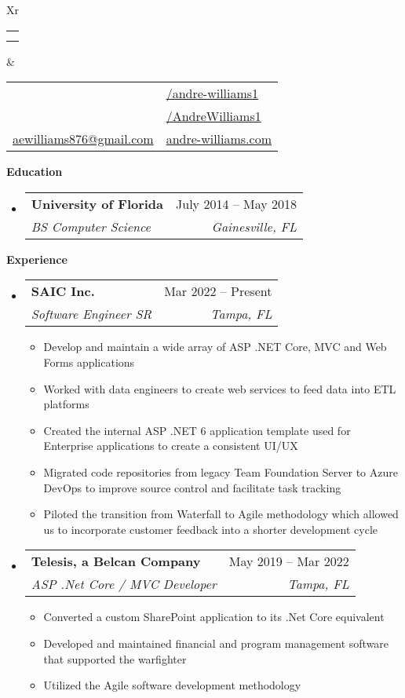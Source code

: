 \documentclass[letterpaper,12pt]{article}[leftmargin=*]
\makeatletter
\def \fullname {Andre Williams}
\def \subtitle {}
\def \linkedinicon {\faLinkedin}
\def \linkedinlink {https://linkedin.com/in/andre-williams1/}
\def \linkedintext {/andre-williams1}
\def \phoneicon {\faPhone}
\def \phonetext {(561) 452-1398}
\def \addressicon {\faMapMarker}
\def \addresstext {7104 S Mascotte St, 33616}
\def \emailicon {\faEnvelope}
\def \emaillink {mailto:aewilliams876@gmail.com}
\def \emailtext {aewilliams876@gmail.com}
\def \githubicon {\faGithub}
\def \githublink {https://github.com/andrewilliams1}
\def \githubtext {/AndreWilliams1}
\def \websiteicon {\faGlobe}
\def \websitelink {andre-williams.com}
\def \websitetext {andre-williams.com}
\def \headertype {\doublecol} %
\def \entryspacing {-0pt}
\def \linkedin {\linkedinicon \hspace{3pt}\href{\linkedinlink}{\linkedintext}}
\def \phone {\phoneicon \hspace{3pt}{ \phonetext}}
\def \address {\addressicon \hspace{3pt}{ \addresstext}}
\def \email {\emailicon \hspace{3pt}\href{\emaillink}{\emailtext}}
\def \github {\githubicon \hspace{3pt}\href{\githublink}{\githubtext}}
\def \website {\websiteicon \hspace{3pt}\href{\websitelink}{\websitetext}}
\renewcommand{\section}[2]{\vspace{5pt}
  \colorbox{secondary}{\color{white}\raggedbottom\normalsize\textbf{{#1}{\hspace{7pt}#2}}}
}
\newcommand{\resumeEntryStart}{\begin{itemize}[leftmargin=2.5mm]}
\newcommand{\resumeEntryEnd}{\end{itemize}\vspace{\entryspacing}}
\newcommand{\resumeItemListStart}{\begin{itemize}[leftmargin=4.5mm]}
\newcommand{\resumeItemListEnd}{\end{itemize}}
\newcommand{\resumeItem}[1]{
  \item\small{
    {#1 \vspace{-2pt}}
  }
}
\newcommand{\resumeEntryTSDL}[4]{
  \vspace{-1pt}\item[]
    \begin{tabularx}{0.97\textwidth}{X@{\hspace{60pt}}r}
      \textbf{\color{primary}#1} & {\firabook\color{accent}\small#2} \\
      \textit{\color{accent}\small#3} & \textit{\color{accent}\small#4} \\
    \end{tabularx}\vspace{-6pt}
}
\newcommand{\doublecol}[6]{
  \begin{tabularx}{\textwidth}{Xr}
    {
      \begin{tabular}[c]{l}
        \fontsize{35}{45}\selectfont{\color{primary}{{\textbf{\fullname}}}} \\
        {\textit{\subtitle}} %
      \end{tabular}
    } & {
      \begin{tabular}[c]{l@{\hspace{1.5em}}l}
        {\small#4} & {\small#1} \\
        {\small#5} & {\small#2} \\
        {\small#6} & {\small#3}
      \end{tabular}
    }
  \end{tabularx}
}
\newcommand{\singlecol}[6]{
  \begin{tabularx}{\textwidth}{Xr}
    {
      \begin{tabular}[b]{l}
        \fontsize{35}{45}\selectfont{\color{primary}{{\textbf{\fullname}}}} \\
        {\textit{\subtitle}} %
      \end{tabular}
    } & {
      \begin{tabular}[c]{l}
        {\small#1} \\
        {\small#2} \\
        {\small#3} \\
        {\small#4} \\
        {\small#5} \\
        {\small#6}
      \end{tabular}
    }
  \end{tabularx}
}
\makeatother
\begin{document}


\headertype{\linkedin}{\github}{\website}{\phone}{\address}{\email}{} %
\vspace{-10pt} %

\section{\faGraduationCap}{Education}

  \resumeEntryStart
    \resumeEntryTSDL
      {University of Florida}{July 2014 -- May 2018}
      {BS Computer Science}{Gainesville, FL}
  \resumeEntryEnd

\section{\faPieChart}{Experience}

 \resumeEntryStart
    \resumeEntryTSDL
      {SAIC Inc.}{Mar 2022 -- Present}
      {Software Engineer SR}{Tampa, FL}
    \resumeItemListStart
      \resumeItem {Develop and maintain a wide array of ASP .NET Core, MVC and Web Forms applications}
      \resumeItem {Worked with data engineers to create web services to feed data into ETL platforms}
      \resumeItem {Created the internal ASP .NET 6 application template used for Enterprise applications to create a consistent UI/UX}
      \resumeItem {Migrated code repositories from legacy Team Foundation Server to Azure DevOps to improve source control and facilitate task tracking}
      \resumeItem {Piloted the transition from Waterfall to Agile methodology which allowed us to incorporate customer feedback into a shorter development cycle}
    \resumeItemListEnd
  \resumeEntryEnd

  \resumeEntryStart
    \resumeEntryTSDL
      {Telesis, a Belcan Company}{May 2019 -- Mar 2022}
      {ASP .Net Core / MVC Developer}{Tampa, FL}
    \resumeItemListStart
      \resumeItem {Converted a custom SharePoint application to its .Net Core equivalent}
      \resumeItem {Developed and maintained financial and program management software that supported the warfighter}
      \resumeItem {Utilized the Agile software development methodology}
    \resumeItemListEnd
  \resumeEntryEnd
\end{document}
